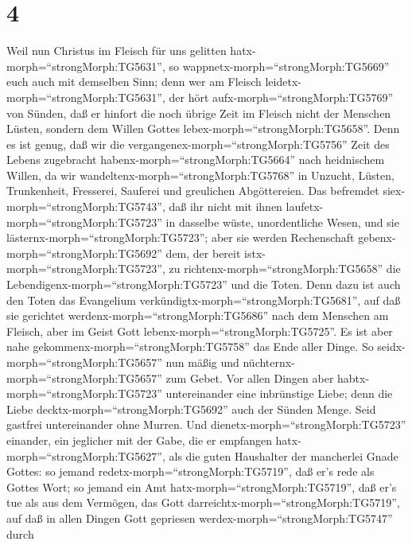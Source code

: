 \hypertarget{section-3}{%
\section{4}\label{section-3}}

 Weil nun Christus im Fleisch für uns gelitten
hatx-morph=``strongMorph:TG5631'', so
wappnetx-morph=``strongMorph:TG5669'' euch auch mit demselben Sinn; denn
wer am Fleisch leidetx-morph=``strongMorph:TG5631'', der hört
aufx-morph=``strongMorph:TG5769'' von Sünden,  daß er
hinfort die noch übrige Zeit im Fleisch nicht der Menschen Lüsten,
sondern dem Willen Gottes lebex-morph=``strongMorph:TG5658''.
 Denn es ist genug, daß wir die
vergangenex-morph=``strongMorph:TG5756'' Zeit des Lebens zugebracht
habenx-morph=``strongMorph:TG5664'' nach heidnischem Willen, da wir
wandeltenx-morph=``strongMorph:TG5768'' in Unzucht, Lüsten, Trunkenheit,
Fresserei, Sauferei und greulichen Abgöttereien.  Das
befremdet siex-morph=``strongMorph:TG5743'', daß ihr nicht mit ihnen
laufetx-morph=``strongMorph:TG5723'' in dasselbe wüste, unordentliche
Wesen, und sie lästernx-morph=``strongMorph:TG5723'';  aber
sie werden Rechenschaft gebenx-morph=``strongMorph:TG5692'' dem, der
bereit istx-morph=``strongMorph:TG5723'', zu
richtenx-morph=``strongMorph:TG5658'' die
Lebendigenx-morph=``strongMorph:TG5723'' und die Toten. 
Denn dazu ist auch den Toten das Evangelium
verkündigtx-morph=``strongMorph:TG5681'', auf daß sie gerichtet
werdenx-morph=``strongMorph:TG5686'' nach dem Menschen am Fleisch, aber
im Geist Gott lebenx-morph=``strongMorph:TG5725''.  Es ist
aber nahe gekommenx-morph=``strongMorph:TG5758'' das Ende aller Dinge.
 So seidx-morph=``strongMorph:TG5657'' nun mäßig und
nüchternx-morph=``strongMorph:TG5657'' zum Gebet. Vor allen Dingen aber
habtx-morph=``strongMorph:TG5723'' untereinander eine inbrünstige Liebe;
denn die Liebe decktx-morph=``strongMorph:TG5692'' auch der Sünden
Menge.  Seid gastfrei untereinander ohne Murren.
 Und dienetx-morph=``strongMorph:TG5723'' einander, ein
jeglicher mit der Gabe, die er empfangen
hatx-morph=``strongMorph:TG5627'', als die guten Haushalter der
mancherlei Gnade Gottes:  so jemand
redetx-morph=``strongMorph:TG5719'', daß er's rede als Gottes Wort; so
jemand ein Amt hatx-morph=``strongMorph:TG5719'', daß er's tue als aus
dem Vermögen, das Gott darreichtx-morph=``strongMorph:TG5719'', auf daß
in allen Dingen Gott gepriesen werdex-morph=``strongMorph:TG5747'' durch
